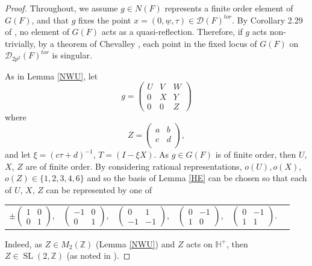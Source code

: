 \documentclass[11pt]{amsart}
\newcommand{\ZZ}{\mathbb{Z}}
\newcommand{\HH}{\mathbb{H}}
\newcommand{\dc}{\mathcal{D}}
\newcommand{\opn}{\operatorname}
\begin{document}
\begin{proof}
Throughout, we assume $g \in N(F)$ represents a finite order element of $G(F)$, and that $g$ fixes the point $ x = (0, \underline{w}, \tau) \in \dc(F)^{tor}$. 
By Corollary 2.29 of \cite{GHSK3}, no element of $G(F)$ acts as a quasi-reflection.
Therefore, if $g$ acts non-trivially, by a theorem of Chevalley \cite{Chevalley}, each point in the fixed locus of $G(F)$ on $\dc_{2p^2}(F)^{tor}$ is singular.

As in Lemma \ref{NWU}, let
\begin{equation*}
g = 
\begin{pmatrix}
U & V & W \\
0 & X & Y \\
0 & 0 & Z
\end{pmatrix}
\end{equation*}
where
\begin{equation*}
Z = 
\begin{pmatrix}
a & b \\
c & d \\
\end{pmatrix}, 
\end{equation*}
and let $\xi = (c \tau + d)^{-1}$, $T = (I - \xi X)$.
As $g \in G(F)$ is of finite order, then $U$, $X$, $Z$ are of finite order.
By considering rational representations, $o(U), o(X)$, $o(Z) \in \{1,2,3,4,6\}$ and so the basis of Lemma \ref{HE} can be chosen so that each of $U$, $X$, $Z$ can be represented by one of
\begin{center}
\begin{tabular}{c c c c c c}
$\pm 
\begin{pmatrix}
1 & 0 \\
0 & 1 
\end{pmatrix}$,
& 
$\begin{pmatrix}
-1 & 0 \\
0 & 1 
\end{pmatrix}$,
&
$\begin{pmatrix}
0 & 1 \\
-1 & -1 
\end{pmatrix}$,
&
$\begin{pmatrix}
0 & -1 \\
1 & 0
\end{pmatrix}$,
& 
$\begin{pmatrix}
0 & -1 \\
1 & 1
\end{pmatrix}$.
\end{tabular}
\end{center}
Indeed, as $Z \in M_2(\ZZ)$ (Lemma \ref{NWU}) and $Z$ acts on $\HH^+$, then $Z \in \opn{SL}(2, \ZZ)$ (as noted in \cite{GHSK3}).


\end{proof}
\end{document}
